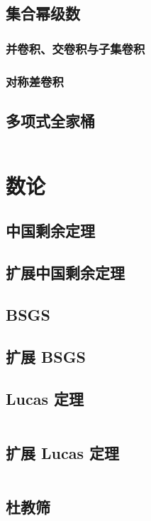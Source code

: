 \documentclass[10pt, a4paper, oneside]{ctexart}
\begin{document}
\begin{multicols}{2}
        \subsection{集合幂级数}
        \subsubsection{并卷积、交卷积与子集卷积}
        
        \subsubsection{对称差卷积}
        
        \subsection{多项式全家桶}
        \inputminted{cpp}{src/poly/poly.cpp}

        \section{数论}
        \subsection{中国剩余定理}
        
        \subsection{扩展中国剩余定理}
        
        \subsection{BSGS}
        
        \subsection{扩展 BSGS}
        
        \subsection{Lucas 定理}
        \inputminted{cpp}{src/number theory/lucas.cpp}
        \subsection{扩展 Lucas 定理}
        \inputminted{cpp}{src/number theory/exlucas.cpp}
        \subsection{杜教筛}
        

\end{multicols}
\end{document}
